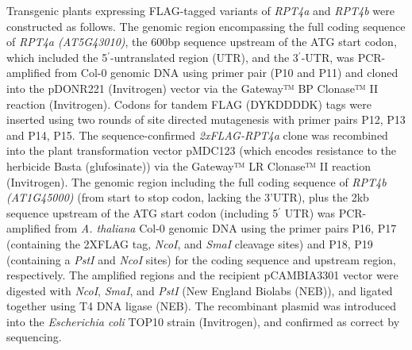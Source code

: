 	Transgenic plants expressing FLAG-tagged variants of \textit{RPT4a} and \textit{RPT4b} were constructed as follows. The genomic region encompassing the full coding sequence of \textit{RPT4a (AT5G43010)}, the 600bp sequence upstream of the ATG start codon, which included the 5$^{\prime}$-untranslated region (UTR), and the 3$^{\prime}$-UTR, was PCR-amplified from Col-0 genomic DNA using primer pair (P10 and P11) and cloned into the pDONR221 (Invitrogen) vector via the Gateway™ BP Clonase™ II reaction (Invitrogen). Codons for tandem FLAG (DYKDDDDK) tags were inserted using two rounds of site directed mutagenesis \citep{edelheit09} with primer pairs P12, P13 and P14, P15. The sequence-confirmed \textit{2xFLAG-RPT4a} clone was recombined into the plant transformation vector pMDC123 (which encodes resistance to the herbicide Basta (glufosinate)) via the Gateway™ LR Clonase™ II reaction (Invitrogen). The genomic region including the full coding sequence of \textit{RPT4b (AT1G45000)} (from start to stop codon, lacking the 3’UTR), plus the 2kb sequence upstream of the ATG start codon (including 5$^{\prime}$ UTR) was PCR-amplified from \textit{A. thaliana} Col-0 genomic DNA using the primer pairs P16, P17 (containing the 2XFLAG tag, \textit{NcoI}, and \textit{SmaI} cleavage sites) and P18, P19 (containing a \textit{PstI} and \textit{NcoI} sites) for the coding sequence and upstream region, respectively. The amplified regions and the recipient pCAMBIA3301 vector were digested with \textit{NcoI}, \textit{SmaI}, and \textit{PstI} (New England Biolabs (NEB)), and ligated together using T4 DNA ligase (NEB). The recombinant plasmid was introduced into the \textit{Escherichia coli} TOP10 strain (Invitrogen), and confirmed as correct by sequencing. 
	
